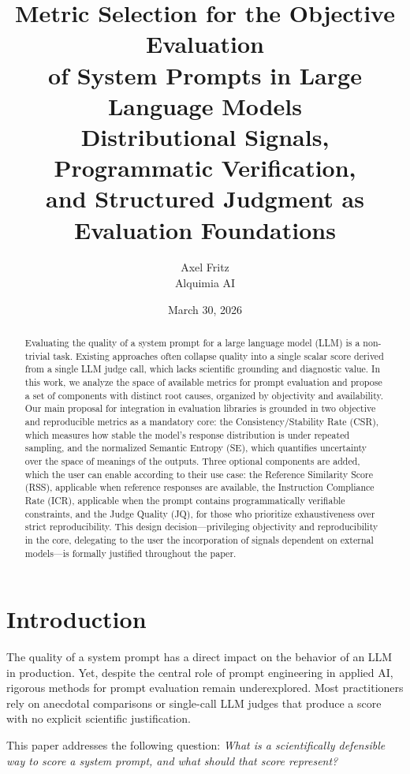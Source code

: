 \documentclass[11pt,a4paper]{article}
\title{
    \vspace{-1cm}
    \textbf{Metric Selection for the Objective Evaluation\\
    of System Prompts in Large Language Models}\\
    \vspace{0.4cm}
    \large Distributional Signals, Programmatic Verification,\\
    and Structured Judgment as Evaluation Foundations
}
\author{
    Axel Fritz\\
    Alquimia AI
}
\date{March 30, 2026}
\begin{document}
\maketitle

\begin{abstract}
Evaluating the quality of a system prompt for a large language model (LLM) is a non-trivial task. Existing approaches often collapse quality into a single scalar score derived from a single LLM judge call, which lacks scientific grounding and diagnostic value. In this work, we analyze the space of available metrics for prompt evaluation and propose a set of components with distinct root causes, organized by objectivity and availability. Our main proposal for integration in evaluation libraries is grounded in two objective and reproducible metrics as a mandatory core: the Consistency/Stability Rate (CSR), which measures how stable the model's response distribution is under repeated sampling, and the normalized Semantic Entropy (SE), which quantifies uncertainty over the space of meanings of the outputs. Three optional components are added, which the user can enable according to their use case: the Reference Similarity Score (RSS), applicable when reference responses are available, the Instruction Compliance Rate (ICR), applicable when the prompt contains programmatically verifiable constraints, and the Judge Quality (JQ), for those who prioritize exhaustiveness over strict reproducibility. This design decision—privileging objectivity and reproducibility in the core, delegating to the user the incorporation of signals dependent on external models—is formally justified throughout the paper.
\end{abstract}

\section{Introduction}

The quality of a system prompt has a direct impact on the behavior of an LLM in production. Yet, despite the central role of prompt engineering in applied AI, rigorous methods for prompt evaluation remain underexplored. Most practitioners rely on anecdotal comparisons or single-call LLM judges that produce a score with no explicit scientific justification.

This paper addresses the following question: \textit{What is a scientifically defensible way to score a system prompt, and what should that score represent?}
\end{document}
